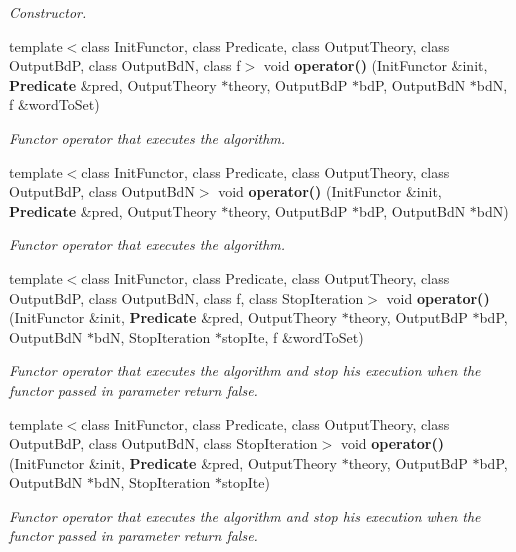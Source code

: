 \begin{CompactItemize}
\begin{CompactList}\small\item\em Constructor. \item\end{CompactList}\item 
template$<$class Init\-Functor, class Predicate, class Output\-Theory, class Output\-Bd\-P, class Output\-Bd\-N, class f$>$ void {\bf operator()} (Init\-Functor \&init, {\bf Predicate} \&pred, Output\-Theory $\ast$theory, Output\-Bd\-P $\ast$bd\-P, Output\-Bd\-N $\ast$bd\-N, f \&word\-To\-Set)
\begin{CompactList}\small\item\em Functor operator that executes the algorithm. \item\end{CompactList}\item 
template$<$class Init\-Functor, class Predicate, class Output\-Theory, class Output\-Bd\-P, class Output\-Bd\-N$>$ void {\bf operator()} (Init\-Functor \&init, {\bf Predicate} \&pred, Output\-Theory $\ast$theory, Output\-Bd\-P $\ast$bd\-P, Output\-Bd\-N $\ast$bd\-N)
\begin{CompactList}\small\item\em Functor operator that executes the algorithm. \item\end{CompactList}\item 
template$<$class Init\-Functor, class Predicate, class Output\-Theory, class Output\-Bd\-P, class Output\-Bd\-N, class f, class Stop\-Iteration$>$ void {\bf operator()} (Init\-Functor \&init, {\bf Predicate} \&pred, Output\-Theory $\ast$theory, Output\-Bd\-P $\ast$bd\-P, Output\-Bd\-N $\ast$bd\-N, Stop\-Iteration $\ast$stop\-Ite, f \&word\-To\-Set)
\begin{CompactList}\small\item\em Functor operator that executes the algorithm and stop his execution when the functor passed in parameter return false. \item\end{CompactList}\item 
template$<$class Init\-Functor, class Predicate, class Output\-Theory, class Output\-Bd\-P, class Output\-Bd\-N, class Stop\-Iteration$>$ void {\bf operator()} (Init\-Functor \&init, {\bf Predicate} \&pred, Output\-Theory $\ast$theory, Output\-Bd\-P $\ast$bd\-P, Output\-Bd\-N $\ast$bd\-N, Stop\-Iteration $\ast$stop\-Ite)
\begin{CompactList}\small\item\em Functor operator that executes the algorithm and stop his execution when the functor passed in parameter return false. \item\end{CompactList}\end{CompactItemize}
